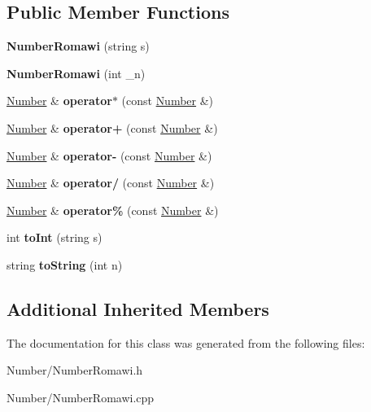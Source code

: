 \subsection*{Public Member Functions}
\begin{DoxyCompactItemize}
\item 
\hypertarget{class_number_romawi_a8b059c30a0be899b20764ba0df8ec646}{}{\bfseries Number\+Romawi} (string s)\label{class_number_romawi_a8b059c30a0be899b20764ba0df8ec646}

\item 
\hypertarget{class_number_romawi_ab78eebcc6ff2d7b756d9f039b1a9ffe4}{}{\bfseries Number\+Romawi} (int \+\_\+n)\label{class_number_romawi_ab78eebcc6ff2d7b756d9f039b1a9ffe4}

\item 
\hypertarget{class_number_romawi_acbe2f18994679930c2fb970086a2d675}{}\hyperlink{class_number}{Number} \& {\bfseries operator$\ast$} (const \hyperlink{class_number}{Number} \&)\label{class_number_romawi_acbe2f18994679930c2fb970086a2d675}

\item 
\hypertarget{class_number_romawi_a62aa9142a55197d57516d8fecd995de2}{}\hyperlink{class_number}{Number} \& {\bfseries operator+} (const \hyperlink{class_number}{Number} \&)\label{class_number_romawi_a62aa9142a55197d57516d8fecd995de2}

\item 
\hypertarget{class_number_romawi_a685da03107430d6a63c02f99ce7b39d0}{}\hyperlink{class_number}{Number} \& {\bfseries operator-\/} (const \hyperlink{class_number}{Number} \&)\label{class_number_romawi_a685da03107430d6a63c02f99ce7b39d0}

\item 
\hypertarget{class_number_romawi_a33d1f44531ddb86bb77e0e14b261b3c4}{}\hyperlink{class_number}{Number} \& {\bfseries operator/} (const \hyperlink{class_number}{Number} \&)\label{class_number_romawi_a33d1f44531ddb86bb77e0e14b261b3c4}

\item 
\hypertarget{class_number_romawi_ab1655c4b36a90ceb23a9d33cc63b9f96}{}\hyperlink{class_number}{Number} \& {\bfseries operator\%} (const \hyperlink{class_number}{Number} \&)\label{class_number_romawi_ab1655c4b36a90ceb23a9d33cc63b9f96}

\item 
\hypertarget{class_number_romawi_a7198e8586508321b6a8da6c5ef92cf18}{}int {\bfseries to\+Int} (string s)\label{class_number_romawi_a7198e8586508321b6a8da6c5ef92cf18}

\item 
\hypertarget{class_number_romawi_a5d22c55f63cfb4e1cc7b7f711f91fba7}{}string {\bfseries to\+String} (int n)\label{class_number_romawi_a5d22c55f63cfb4e1cc7b7f711f91fba7}

\end{DoxyCompactItemize}
\subsection*{Additional Inherited Members}


The documentation for this class was generated from the following files\+:\begin{DoxyCompactItemize}
\item 
Number/Number\+Romawi.\+h\item 
Number/Number\+Romawi.\+cpp\end{DoxyCompactItemize}
